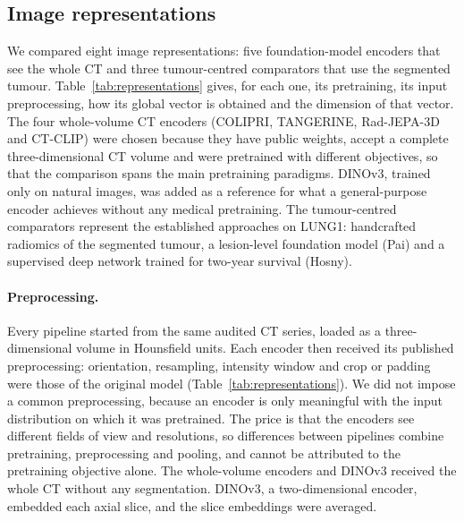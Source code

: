 \FloatBarrier
\subsection{Image representations}\label{sec:representations}
We compared eight image representations: five foundation-model encoders that see the whole CT and three tumour-centred comparators that use the segmented tumour. Table~\ref{tab:representations} gives, for each one, its pretraining, its input preprocessing, how its global vector is obtained and the dimension of that vector. The four whole-volume CT encoders (COLIPRI, TANGERINE, Rad-JEPA-3D and CT-CLIP) were chosen because they have public weights, accept a complete three-dimensional CT volume and were pretrained with different objectives, so that the comparison spans the main pretraining paradigms. DINOv3, trained only on natural images, was added as a reference for what a general-purpose encoder achieves without any medical pretraining. The tumour-centred comparators represent the established approaches on LUNG1: handcrafted radiomics of the segmented tumour, a lesion-level foundation model (Pai)\cite{pai2024} and a supervised deep network trained for two-year survival (Hosny).\cite{hosny2018}

\tabRepresentations

\paragraph{Preprocessing.} Every pipeline started from the same audited CT series, loaded as a three-dimensional volume in Hounsfield units. Each encoder then received its published preprocessing: orientation, resampling, intensity window and crop or padding were those of the original model (Table~\ref{tab:representations}). We did not impose a common preprocessing, because an encoder is only meaningful with the input distribution on which it was pretrained. The price is that the encoders see different fields of view and resolutions, so differences between pipelines combine pretraining, preprocessing and pooling, and cannot be attributed to the pretraining objective alone. The whole-volume encoders and DINOv3 received the whole CT without any segmentation. DINOv3, a two-dimensional encoder, embedded each axial slice, and the slice embeddings were averaged.

